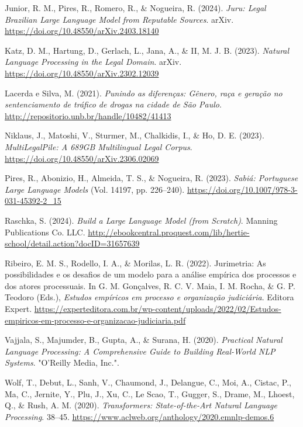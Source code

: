 \documentclass[
  12pt,
]{article}
\newlength{\cslhangindent}
\newenvironment{CSLReferences}[2] %
 {\begin{list}{}{%
  \setlength{\itemindent}{0pt}
  \setlength{\leftmargin}{0pt}
  \setlength{\parsep}{0pt}
  \ifodd #1
   \setlength{\leftmargin}{\cslhangindent}
   \setlength{\itemindent}{-1\cslhangindent}
  \fi
  \setlength{\itemsep}{#2\baselineskip}}}
 {\end{list}}
\begin{document}
\begin{CSLReferences}{1}{0}
Junior, R. M., Pires, R., Romero, R., \& Nogueira, R. (2024).
\emph{Juru: {Legal} {Brazilian} {Large} {Language} {Model} from
{Reputable} {Sources}}. arXiv.
\url{https://doi.org/10.48550/arXiv.2403.18140}

Katz, D. M., Hartung, D., Gerlach, L., Jana, A., \& II, M. J. B. (2023).
\emph{Natural {Language} {Processing} in the {Legal} {Domain}}. arXiv.
\url{https://doi.org/10.48550/arXiv.2302.12039}

Lacerda e Silva, M. (2021). \emph{Punindo as diferenças: {Gênero}, raça
e geração no sentenciamento de tráfico de drogas na cidade de {São}
{Paulo}}. \url{http://repositorio.unb.br/handle/10482/41413}

Niklaus, J., Matoshi, V., Sturmer, M., Chalkidis, I., \& Ho, D. E.
(2023). \emph{{MultiLegalPile}: {A} {689GB} {Multilingual} {Legal}
{Corpus}}. \url{https://doi.org/10.48550/arXiv.2306.02069}

Pires, R., Abonizio, H., Almeida, T. S., \& Nogueira, R. (2023).
\emph{Sabiá: {Portuguese} {Large} {Language} {Models}} (Vol. 14197, pp.
226--240). \url{https://doi.org/10.1007/978-3-031-45392-2_15}

Raschka, S. (2024). \emph{Build a {Large} {Language} {Model} (from
{Scratch})}. Manning Publications Co. LLC.
\url{http://ebookcentral.proquest.com/lib/hertie-school/detail.action?docID=31657639}

Ribeiro, E. M. S., Rodello, I. A., \& Morilas, L. R. (2022). Jurimetria:
As possibilidades e os desafios de um modelo para a análise empírica dos
processos e dos atores processuais. In G. M. Gonçalves, R. C. V. Maia,
I. M. Rocha, \& G. P. Teodoro (Eds.), \emph{Estudos empíricos em
processo e organização judiciária}. Editora Expert.
\url{https://experteditora.com.br/wp-content/uploads/2022/02/Estudos-empiricos-em-processo-e-organizacao-judiciaria.pdf}

Vajjala, S., Majumder, B., Gupta, A., \& Surana, H. (2020).
\emph{Practical {Natural} {Language} {Processing}: {A} {Comprehensive}
{Guide} to {Building} {Real}-{World} {NLP} {Systems}}. "O'Reilly Media,
Inc.".

Wolf, T., Debut, L., Sanh, V., Chaumond, J., Delangue, C., Moi, A.,
Cistac, P., Ma, C., Jernite, Y., Plu, J., Xu, C., Le Scao, T., Gugger,
S., Drame, M., Lhoest, Q., \& Rush, A. M. (2020). \emph{Transformers:
{State}-of-the-{Art} {Natural} {Language} {Processing}}. 38--45.
\url{https://www.aclweb.org/anthology/2020.emnlp-demos.6}

\end{CSLReferences}
\end{document}
